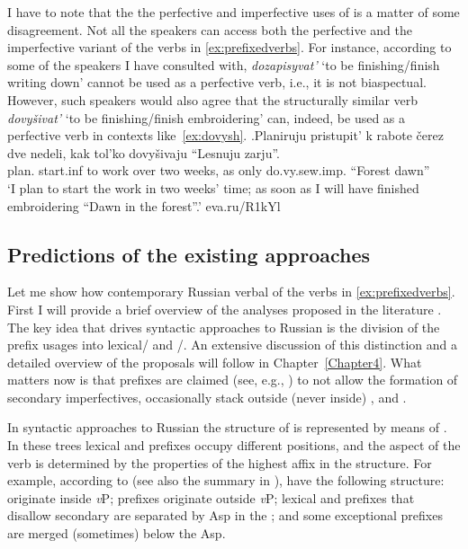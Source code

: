 I have to note that the  the perfective and imperfective uses of  is a matter of some disagreement. Not all the speakers can access both the perfective and the imperfective variant of the verbs in \ref{ex:prefixedverbs}. For instance, according to some of the speakers I have consulted with, \textit{dozapisyvat'} `to be finishing/finish writing down' cannot be used as a perfective verb, i.e., it is not biaspectual. However, such speakers would also agree that the structurally similar verb \textit{dovy\v{s}ivat'} `to be finishing/finish embroidering' can, indeed, be used as a perfective verb in contexts like~\ref{ex:dovysh}.
\exg.\label{ex:dovysh}Planiruju pristupit' k rabote \v{c}erez dve nedeli, kak tol'ko dovy\v{s}ivaju ``Lesnuju zarju''.\\
plan. start.inf to work over two weeks, as only do.vy.sew.imp. ``Forest dawn''\\
\trans `I plan to start the work in two weeks' time; as soon as I will have finished embroidering ``Dawn in the forest''.'
\hfill eva.ru/R1kYl

\subsection{Predictions of the existing approaches}\label{subsection:bi:predictions}
Let me show how contemporary  Russian verbal   of the verbs in \ref{ex:prefixedverbs}. First I will provide a brief overview of the analyses proposed in the literature \citep{Ramchand:04, Svenonius:04a, Svenonius:04b, Romanova:06, Tatevosov:07, Tatevosov:09}. The key idea that drives syntactic approaches to Russian  is the division of the prefix usages into lexical/ and /. An extensive discussion of this distinction and a detailed overview of the proposals will follow in Chapter~\ref{Chapter4}. What matters now is that  prefixes are claimed (see, e.g., \citealt[229]{Svenonius:04b}) to not allow the formation of secondary imperfectives, occasionally stack outside (never inside) , and .

In syntactic approaches to Russian  the  structure of  is represented by means of . In these trees lexical and  prefixes occupy different positions, and the aspect of the verb is determined by the properties of the highest affix in the structure. For example, according to \citealt{Svenonius:04b} (see also the summary in \citealt{Svenonius:12}),  have the following structure:  originate inside \textit{v}P;  prefixes originate outside \textit{v}P; lexical and  prefixes that disallow secondary  are separated by Asp in the ; and some exceptional  prefixes are merged (sometimes) below the Asp.

